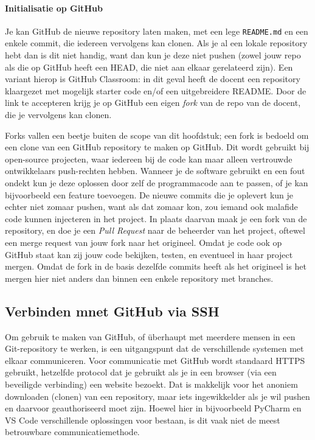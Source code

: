 \paragraph{Initialisatie op GitHub}
Je kan GitHub de nieuwe repository laten maken, met een lege \texttt{README.md} en een enkele commit, die iedereen vervolgens kan clonen. Als je al een lokale repository hebt dan is dit niet handig, want dan kun je deze niet pushen (zowel jouw repo als die op GitHub heeft een HEAD, die niet aan elkaar gerelateerd zijn). Een variant hierop is GitHub Classroom: in dit geval heeft de docent een repository klaargezet met mogelijk starter code en/of een uitgebreidere README. Door de link te accepteren krijg je op GitHub een eigen \emph{fork} van de repo van de docent, die je vervolgens kan clonen.

\begin{aside}[Forks]
Forks vallen een beetje buiten de scope van dit hoofdstuk; een fork is bedoeld om een clone van een GitHub repository te maken op GitHub. Dit wordt gebruikt bij open-source projecten, waar iedereen bij de code kan maar alleen vertrouwde ontwikkelaars push-rechten hebben. Wanneer je de software gebruikt en een fout ondekt kun je deze oplossen door zelf de programmacode aan te passen, of je kan bijvoorbeeld een feature toevoegen. De nieuwe commits die je oplevert kun je echter niet zomaar pushen, want als dat zomaar kon, zou iemand ook malafide code kunnen injecteren in het project. In plaats daarvan maak je een fork van de repository, en doe je een \emph{Pull Request} naar de beheerder van het project, oftewel een merge request van jouw fork naar het origineel. Omdat je code ook op GitHub staat kan zij jouw code bekijken, testen, en eventueel in haar project mergen. Omdat de fork in de basis dezelfde commits heeft als het origineel is het mergen hier niet anders dan binnen een enkele repository met branches.
\end{aside}

\subsection{Verbinden mnet GitHub via SSH} \label{sec:ssh}
Om gebruik te maken van GitHub, of \"uberhaupt met meerdere mensen in een Git-repository te werken, is een uitgangspunt dat de verschillende systemen met elkaar communiceren. Voor communicatie met GitHub wordt standaard HTTPS gebruikt, hetzelfde protocol dat je gebruikt als je in een browser (via een beveiligde verbinding) een website bezoekt. Dat is makkelijk voor het anoniem downloaden (clonen) van een repository, maar iets ingewikkelder als je wil pushen en daarvoor geauthoriseerd moet zijn. Hoewel hier in bijvoorbeeld PyCharm en VS Code verschillende oplossingen voor bestaan, is dit vaak niet de meest betrouwbare communicatiemethode.

